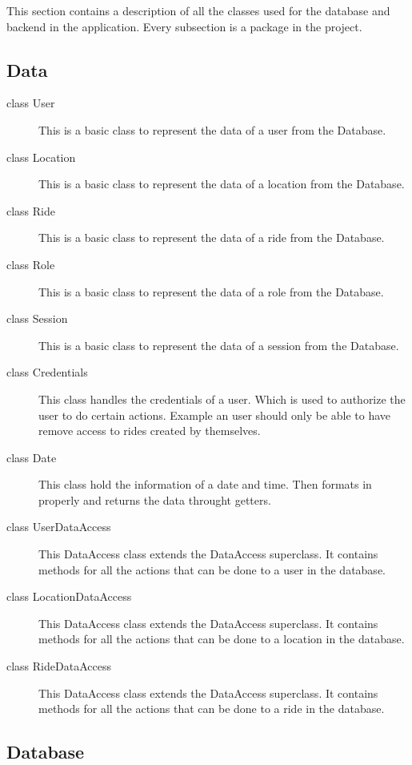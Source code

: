 \documentclass{article}
\begin{document}
This section contains a description of all the classes used for the database and backend in the application. Every subsection is a package in the project.

\subsection{Data}

\begin{description}
    \item[class User] This is a basic class to represent the data of a user from the Database.
    \item[class Location] This is a basic class to represent the data of a location from the Database.
    \item[class Ride] This is a basic class to represent the data of a ride from the Database.
    \item[class Role] This is a basic class to represent the data of a role from the Database.
    \item[class Session] This is a basic class to represent the data of a session from the Database.
    \item[class Credentials] This class handles the credentials of a user. Which is used to authorize the user to do certain actions. Example an user should only be able to have remove access to rides created by themselves.
    \item[class Date] This class hold the information of a date and time. Then formats in properly and returns the data throught getters.
    \item[class UserDataAccess] This DataAccess class extends the DataAccess superclass. It contains methods for all the actions that can be done to a user in the database.
    \item[class LocationDataAccess] This DataAccess class extends the DataAccess superclass. It contains methods for all the actions that can be done to a location in the database.
    \item[class RideDataAccess] This DataAccess class extends the DataAccess superclass. It contains methods for all the actions that can be done to a ride in the database.
\end{description}

\subsection{Database}
\end{document}
